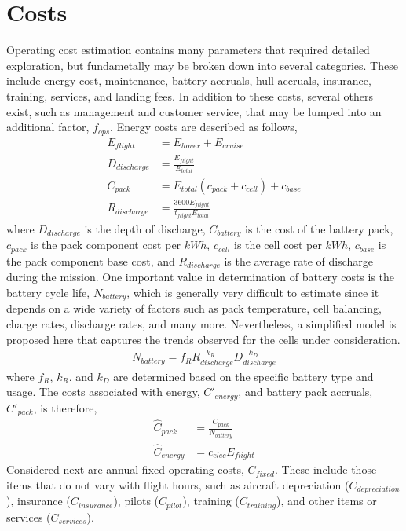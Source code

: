 \documentclass[12pt, letter]{article}
\begin{document}
\section{Costs}
Operating cost estimation contains many parameters that required detailed exploration, but fundametally may be broken down into several categories. These include energy cost, maintenance, battery accruals, hull accruals, insurance, training, services, and landing fees. In addition to these costs, several others exist, such as management and customer service, that may be lumped into an additional factor, $f_{ops}$. Energy costs are described as follows,
\begin{align}
	E_{flight}&=E_{hover}+E_{cruise} \\
	D_{discharge}&=\frac{E_{flight}}{E_{total}} \\
	C_{pack}&=E_{total} \left(c_{pack}+c_{cell}\right) + c_{base}\\
	R_{discharge}&=\frac{3600 E_{flight}}{t_{flight} E_{total}}
\end{align}
where $D_{discharge}$ is the depth of discharge, $C_{battery}$ is the cost of the battery pack, $c_{pack}$ is the pack component cost per $kWh$, $c_{cell}$ is the cell cost per $kWh$, $c_{base}$ is the pack component base cost, and $R_{discharge}$ is the average rate of discharge during the mission. One important value in determination of battery costs is the battery cycle life, $N_{battery}$, which is generally very difficult to estimate since it depends on a wide variety of factors such as pack temperature, cell balancing, charge rates, discharge rates, and many more. Nevertheless, a simplified model is proposed here that captures the trends observed for the cells under consideration.
\begin{align}
	N_{battery}=f_R R_{discharge}^{-k_R} D_{discharge}^{-k_D}
\end{align}
where $f_R$, $k_R$. and $k_D$ are determined based on the specific battery type and usage. The costs associated with energy, $C'_{energy}$, and battery pack accruals, $C'_{pack}$, is therefore,
\begin{align}
	\hat{C}_{pack}&=\frac{C_{pack}}{N_{battery}} \\
	\hat{C}_{energy}&=c_{elec} E_{flight}
\end{align}
Considered next are annual fixed operating costs, $C_{fixed}$. These include those items that do not vary with flight hours, such as aircraft depreciation ($C_{depreciation}$), insurance ($C_{insurance}$), pilots ($C_{pilot}$), training ($C_{training}$), and other items or services ($C_{services}$).
\end{document}
